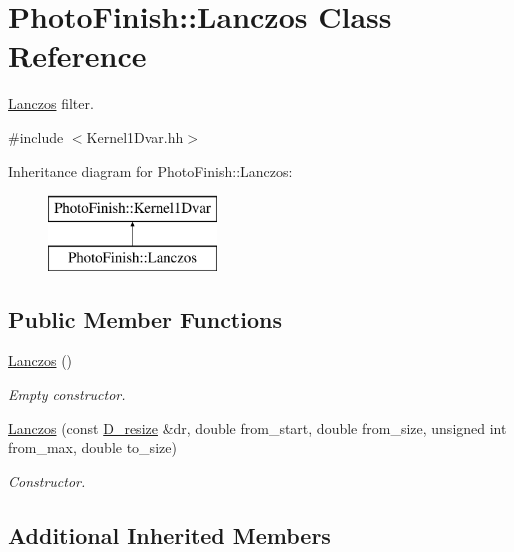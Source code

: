 \hypertarget{class_photo_finish_1_1_lanczos}{}\section{Photo\+Finish\+:\+:Lanczos Class Reference}
\label{class_photo_finish_1_1_lanczos}


\hyperlink{class_photo_finish_1_1_lanczos}{Lanczos} filter.  




{\ttfamily \#include $<$Kernel1\+Dvar.\+hh$>$}

Inheritance diagram for Photo\+Finish\+:\+:Lanczos\+:\begin{figure}[H]
\begin{center}
\leavevmode
\includegraphics[height=2.000000cm]{class_photo_finish_1_1_lanczos}
\end{center}
\end{figure}
\subsection*{Public Member Functions}
\begin{DoxyCompactItemize}
\item 
\hyperlink{class_photo_finish_1_1_lanczos_af55b793ca07b3aa2f3dd01e7281c43ef}{Lanczos} ()
\begin{DoxyCompactList}\small\item\em Empty constructor. \end{DoxyCompactList}\item 
\hyperlink{class_photo_finish_1_1_lanczos_a9d7b8430316c1ae142ee05464362792c}{Lanczos} (const \hyperlink{class_photo_finish_1_1_d__resize}{D\+\_\+resize} \&dr, double from\+\_\+start, double from\+\_\+size, unsigned int from\+\_\+max, double to\+\_\+size)
\begin{DoxyCompactList}\small\item\em Constructor. \end{DoxyCompactList}\end{DoxyCompactItemize}
\subsection*{Additional Inherited Members}


